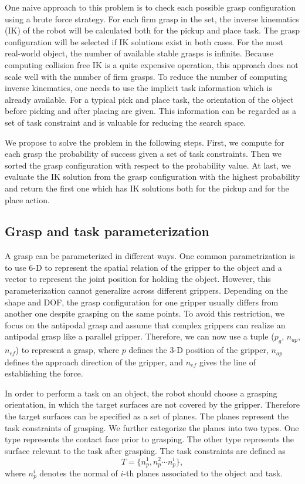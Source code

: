 One naive approach to this problem is to check each possible grasp configuration using a brute force strategy. For each firm grasp in the set, the inverse kinematics (IK) of the robot will be calculated both for the pickup and place task. The grasp configuration will be selected if IK solutions exist in both cases. For the most real-world object, the number of available stable grasps is infinite. Because computing collision free IK is a quite expensive operation, this approach does not scale well with the number of firm grasps. To reduce the number of computing inverse kinematics, one needs to use the implicit task information which is already available. For a typical pick and place task, the orientation of the object before picking and after placing are given. This information can be regarded as a set of task constraint and is valuable for reducing the search space. 

We propose to solve the problem in the following steps. First, we compute for each grasp the probability of success given a set of task constraints. Then we sorted the grasp configuration with respect to the probability value. At last, we evaluate the IK solution from the grasp configuration with the highest probability and return the first one which has IK solutions both for the pickup and for the place action. 

\subsection{Grasp and task parameterization}

A grasp can be parameterized in different ways. One common parametrization is to use 6-D to represent the spatial relation of the gripper to the object and a vector to represent the joint position for holding the object. However, this parameterization cannot generalize across different grippers. Depending on the shape and DOF, the grasp configuration for one gripper usually differs from another one despite grasping on the same points. To avoid this restriction, we focus on the antipodal grasp and assume that complex grippers can realize an antipodal grasp like a parallel gripper. Therefore, we can now use a tuple ($p_g$, $n_{ap}$, $n_{ef}$) to represent a grasp, where $p$ defines the 3-D position of the gripper, $n_{ap}$ defines the approach direction of the gripper, and $n_{ef}$ gives the line of establishing the force. 

In order to perform a task on an object, the robot should choose a grasping orientation, in which the target surfaces are not covered by the gripper. Therefore the target surfaces can be specified as a set of planes. The planes represent the task constraints of grasping. We further categorize the planes into two types. One type represents the contact face prior to grasping. The other type represents the surface relevant to the task after grasping. The task constraints are defined as 
\begin{equation}
T= \{n^1_p, n^2_p \cdots n^i_p \},
\end{equation}
where $n^i_p$ denotes the normal of $i$-th planes associated to the object and task. 

